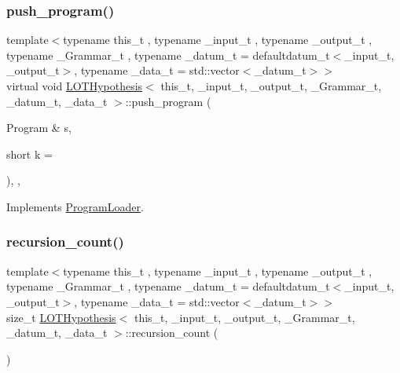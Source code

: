 \subsubsection{\texorpdfstring{push\+\_\+program()}{push\_program()}}
{\footnotesize\ttfamily template$<$typename this\+\_\+t , typename \+\_\+input\+\_\+t , typename \+\_\+output\+\_\+t , typename \+\_\+\+Grammar\+\_\+t , typename \+\_\+datum\+\_\+t  = defaultdatum\+\_\+t$<$\+\_\+input\+\_\+t, \+\_\+output\+\_\+t$>$, typename \+\_\+data\+\_\+t  = std\+::vector$<$\+\_\+datum\+\_\+t$>$$>$ \\
virtual void \hyperlink{class_l_o_t_hypothesis}{L\+O\+T\+Hypothesis}$<$ this\+\_\+t, \+\_\+input\+\_\+t, \+\_\+output\+\_\+t, \+\_\+\+Grammar\+\_\+t, \+\_\+datum\+\_\+t, \+\_\+data\+\_\+t $>$\+::push\+\_\+program (\begin{DoxyParamCaption}\item[{Program \&}]{s,  }\item[{short}]{k = {} }\end{DoxyParamCaption})\hspace{0.3cm}{\ttfamily [inline]}, {\ttfamily [override]}, {\ttfamily [virtual]}}



Implements \hyperlink{class_program_loader_a68b234befb88579aaeeeed52414f9bd1}{Program\+Loader}.

\mbox{\label{class_l_o_t_hypothesis_a87050731f95b5451fd7ae37adffded4a}} 
\subsubsection{\texorpdfstring{recursion\+\_\+count()}{recursion\_count()}}
{\footnotesize\ttfamily template$<$typename this\+\_\+t , typename \+\_\+input\+\_\+t , typename \+\_\+output\+\_\+t , typename \+\_\+\+Grammar\+\_\+t , typename \+\_\+datum\+\_\+t  = defaultdatum\+\_\+t$<$\+\_\+input\+\_\+t, \+\_\+output\+\_\+t$>$, typename \+\_\+data\+\_\+t  = std\+::vector$<$\+\_\+datum\+\_\+t$>$$>$ \\
size\+\_\+t \hyperlink{class_l_o_t_hypothesis}{L\+O\+T\+Hypothesis}$<$ this\+\_\+t, \+\_\+input\+\_\+t, \+\_\+output\+\_\+t, \+\_\+\+Grammar\+\_\+t, \+\_\+datum\+\_\+t, \+\_\+data\+\_\+t $>$\+::recursion\+\_\+count (\begin{DoxyParamCaption}{ }\end{DoxyParamCaption})\hspace{0.3cm}{\ttfamily [inline]}}



